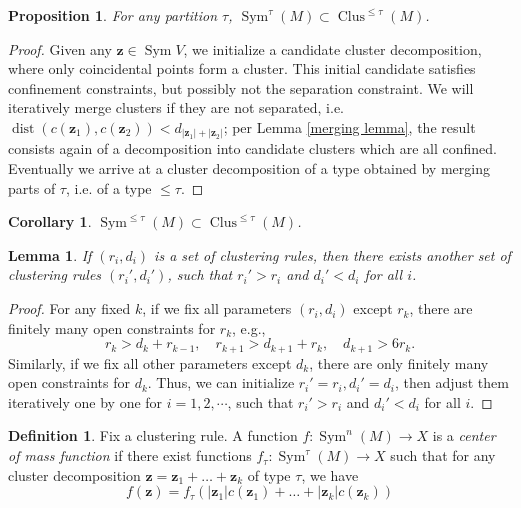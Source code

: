\documentclass{article}
\DeclareMathOperator{\Sym}{Sym}
\DeclareMathOperator{\Clus}{Clus}
\DeclareMathOperator{\dist}{dist}
\newtheorem{lemma}[theorem]{Lemma}
\newtheorem{corollary}[theorem]{Corollary}
\newtheorem{proposition}[theorem]{Proposition}
\theoremstyle{definition}
\newtheorem{definition}
[theorem]{Definition}
\begin{document}
\begin{proposition}
For any partition $\tau$,  $\Sym^{\tau}(M) \subset  \Clus^{\le \tau} (M)$. 
\end{proposition}
\begin{proof}
Given any $\mathbf{z} \in \Sym V$, we  initialize a candidate cluster decomposition, where only coincidental points form a cluster. This initial candidate satisfies confinement constraints, but possibly not the separation constraint. 
We will iteratively merge clusters if they are not separated, i.e. $\dist(c(\mathbf{z}_1), c(\mathbf{z}_2)) < d_{|\mathbf{z}_1| + |\mathbf{z}_2|}$; per Lemma \ref{merging lemma}, the result consists again of a decomposition into candidate clusters which are all confined. 
Eventually we arrive at a cluster decomposition of a type obtained by merging parts of $\tau$, i.e. of a type $\le \tau$. 
\end{proof}

\begin{corollary}
    $\Sym^{\le \tau}(M) \subset \Clus^{\le \tau}(M)$. 
\end{corollary}



\begin{lemma} \label{relax r and d}
If $(r_i,d_i)$ is a set of clustering rules, then there exists another set of clustering rules $(r_i', d_i')$, such that $r_i' > r_i$ and $d_i'<d_i$ for all $i$. 
\end{lemma}
\begin{proof}
    For any fixed $k$, if we fix all parameters $(r_i, d_i)$ except $r_k$, there are finitely many open constraints for $r_k$, e.g., 
    $$  r_k > d_k + r_{k-1}, \quad r_{k+1} > d_{k+1} + r_k, \quad d_{k+1} > 6 r_k. $$
    Similarly, if we fix all other parameters except $d_k$, there are only finitely many open constraints for $d_k$. Thus, we can initialize $r_i'=r_i, d_i'=d_i$, then adjust them iteratively one by one for $i=1,2,\cdots$, such that $r_i' > r_i$ and $d_i'<d_i$ for all $i$. 
\end{proof}



\begin{definition}
Fix a clustering rule.  A function $f: \Sym^n(M) \to X$ is a {\em center of mass function} if there exist functions $f_\tau: \Sym^\tau(M) \to X$ such that for any cluster decomposition
$\mathbf{z} = \mathbf{z}_1 + \ldots + \mathbf{z}_k$ of type $\tau$, we have
$$f(\mathbf{z}) = f_\tau(|\mathbf{z}_1| c(\mathbf{z}_1) + \ldots + |\mathbf{z}_k| c( \mathbf{z}_k) )$$
\end{definition}
\end{document}
